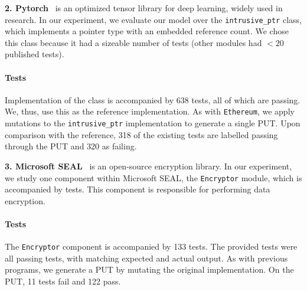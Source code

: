  
\noindent\textbf{2. Pytorch}~\cite{pytorch} is an optimized tensor library for deep learning, widely used in research. In our experiment, we evaluate our model over the \texttt{intrusive\_ptr} class, which implements a pointer type with an embedded reference count.
We chose this class because it had a sizeable number of tests (other modules had $<20$ published tests). 

\paragraph{Tests}
Implementation of the class is accompanied by 638 tests, all of which are passing. We, thus, use this as the reference implementation.  %
As with \texttt{Ethereum}, we apply mutations to the \texttt{intrusive\_ptr} implementation to generate a single PUT. Upon comparison with the reference,  318 of the existing tests are labelled passing through the PUT and 320 as failing.  %

\noindent\textbf{3. Microsoft SEAL}~\cite{sealcrypto} is an open-source encryption library. In our experiment, we study one component within Microsoft SEAL, the \texttt{Encryptor} module, which is accompanied by tests. This component is responsible for performing data encryption.


\paragraph{Tests}
The \texttt{Encryptor} component is accompanied by 133 tests. %
The provided tests were all passing tests, with matching expected and actual output. 
As with previous programs, we generate a PUT by mutating the original implementation. On the PUT, 11 tests fail and 122 pass. %


